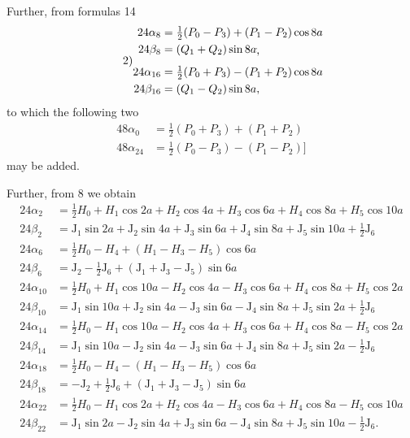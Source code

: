 \begin{landscape}
\[\]
\par\noindent\hspace*{\parindent}Further, from formulas 14
\[
\tag*{2)}
\begin{aligned}
24\alpha_8&=\tfrac12(P_0-P_3)+(P_1-P_2)\cos8a\\
24\beta_8&=(Q_1+Q_2)\sin8a\VthreeTerminalPair\\[4pt]
24\alpha_{16}&=\tfrac12(P_0+P_3)-(P_1+P_2)\cos8a\\
24\beta_{16}&=(Q_1-Q_2)\sin8a,
\end{aligned}
\]
to which the following two
\[
\begin{aligned}
48\alpha_0&=\tfrac12(P_0+P_3)+(P_1+P_2)\\
48\alpha_{24}&=\tfrac12(P_0-P_3)-(P_1-P_2)]
\end{aligned}
\]
may be added.
\par\noindent\hspace*{\parindent}Further, from 8 we obtain
\[
\tag*{3)}
\begin{aligned}
24\alpha_2&=\tfrac12 H_0+H_1\cos2a+H_2\cos4a+H_3\cos6a+H_4\cos8a+H_5\cos10a\\
24\beta_2&=\mathrm{J}_1\sin2a+\mathrm{J}_2\sin4a+\mathrm{J}_3\sin6a+\mathrm{J}_4\sin8a+\mathrm{J}_5\sin10a+\tfrac12\mathrm{J}_6\\[4pt]
24\alpha_6&=\tfrac12 H_0-H_4+(H_1-H_3-H_5)\cos6a\\
24\beta_6&=\mathrm{J}_2-\tfrac12\mathrm{J}_6+(\mathrm{J}_1+\mathrm{J}_3-\mathrm{J}_5)\sin6a\\[4pt]
24\alpha_{10}&=\tfrac12 H_0+H_1\cos10a-H_2\cos4a-H_3\cos6a+H_4\cos8a+H_5\cos2a\\
24\beta_{10}&=\mathrm{J}_1\sin10a+\mathrm{J}_2\sin4a-\mathrm{J}_3\sin6a-\mathrm{J}_4\sin8a+\mathrm{J}_5\sin2a+\tfrac12\mathrm{J}_6\\[4pt]
24\alpha_{14}&=\tfrac12 H_0-H_1\cos10a-H_2\cos4a+H_3\cos6a+H_4\cos8a-H_5\cos2a\\
24\beta_{14}&=\mathrm{J}_1\sin10a-\mathrm{J}_2\sin4a-\mathrm{J}_3\sin6a+\mathrm{J}_4\sin8a+\mathrm{J}_5\sin2a-\tfrac12\mathrm{J}_6\\[4pt]
24\alpha_{18}&=\tfrac12 H_0-H_4-(H_1-H_3-H_5)\cos6a\\
24\beta_{18}&=-\mathrm{J}_2+\tfrac12\mathrm{J}_6+(\mathrm{J}_1+\mathrm{J}_3-\mathrm{J}_5)\sin6a\\[4pt]
24\alpha_{22}&=\tfrac12 H_0-H_1\cos2a+H_2\cos4a-H_3\cos6a+H_4\cos8a-H_5\cos10a\\
24\beta_{22}&=\mathrm{J}_1\sin2a-\mathrm{J}_2\sin4a+\mathrm{J}_3\sin6a-\mathrm{J}_4\sin8a+\mathrm{J}_5\sin10a-\tfrac12\mathrm{J}_6.

\end{aligned}\]
\end{landscape}
